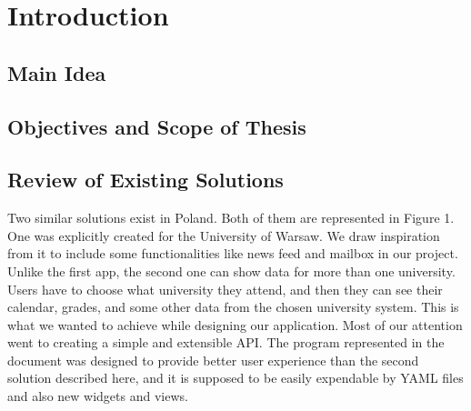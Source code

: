 \chapter{Introduction}
\section{Main Idea}

\section{Objectives and Scope of Thesis}

\section{Review of Existing Solutions}

Two similar solutions exist in Poland. Both of them are represented in Figure 1. One was explicitly created for the University of Warsaw. We draw inspiration from it to include some functionalities like news feed and mailbox in our project. Unlike the first app, the second one can show data for more than one university. Users have to choose what university they attend, and then they can see their calendar, grades, and some other data from the chosen university system. This is what we wanted to achieve while designing our application. Most of our attention went to creating a simple and extensible API. The program represented in the document was designed to provide better user experience than the second solution described here, and it is supposed to be easily expendable by YAML files and also new widgets and views.

